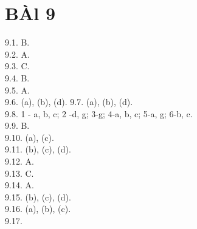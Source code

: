 \documentclass[10pt]{article}
\begin{document}
\section*{BÀl 9}
9.1. B.\\
9.2. A.\\
9.3. C.\\
9.4. B.\\
9.5. A.\\
9.6. (a), (b), (d). 9.7. (a), (b), (d).\\
9.8. 1 - a, b, c; 2 -d, g; 3-g; 4-a, b, c; 5-a, g; 6-b, c.\\
9.9. B.\\
9.10. (a), (c).\\
9.11. (b), (c), (d).\\
9.12. A.\\
9.13. C.\\
9.14. A.\\
9.15. (b), (c), (d).\\
9.16. (a), (b), (c).\\
9.17.
\end{document}
